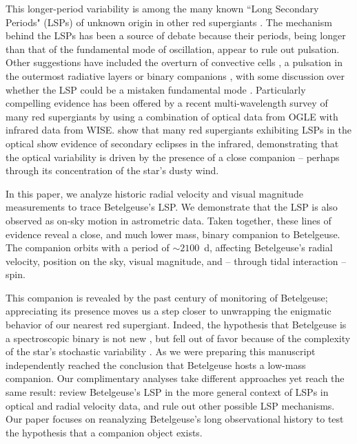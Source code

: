 \documentclass[twocolumn]{aastex631}
\begin{document}
This longer-period variability is among the many known ``Long Secondary Periods" (LSPs) of unknown origin in other red supergiants \citep[e.g.][]{1963AJ.....68..253H,1999IAUS..191..151W,2003ApJ...584.1035O,2004ApJ...604..800W,2006ApJ...650L..55D,2006MNRAS.372.1721K,2007ApJ...660.1486S,2009JRASC.103...11P,2009MNRAS.399.2063N,2009ApJ...707..573W,2010AJ....139.1909N,2010ApJ...725.1170S,2014ApJ...788...13S,2015MNRAS.448..464T,2015MNRAS.452.3863S,2016JAVSO..44...94P,2020MNRAS.492.1348T,2021ApJ...911L..22S,2021A&A...649A.110P,2023JAVSO..51..237P,2023StGal...6....6T,2024A&A...682A..88P}. The mechanism behind the LSPs has been a source of debate because their periods, being longer than that of the fundamental mode of oscillation, appear to rule out pulsation. Other suggestions have included the overturn of convective cells \citep[e.g.][]{2010ApJ...725.1170S}, a pulsation in the outermost radiative layers \citep{2015MNRAS.452.3863S,2020MNRAS.492.1348T}  or binary companions \citep{1999IAUS..191..151W,2004ApJ...604..800W,2007ApJ...660.1486S,2014ApJ...788...13S,2021ApJ...911L..22S}, with some discussion over whether the LSP could be a mistaken fundamental mode \citep{2023MNRAS.526.2765S,2023RNAAS...7..119M}. Particularly compelling evidence has been offered by a recent multi-wavelength survey of many red supergiants by \citet{2021ApJ...911L..22S} using a combination of optical data from OGLE with infrared data from WISE. \citet{2021ApJ...911L..22S} show that many red supergiants exhibiting LSPs in the optical show evidence of secondary eclipses in the infrared, demonstrating that the optical variability is driven by the presence of a close companion -- perhaps through its concentration of the star's dusty wind. 

In this paper, we analyze historic radial velocity and visual magnitude measurements to trace Betelgeuse's LSP. We demonstrate that the LSP is also observed as on-sky motion in astrometric data. 
Taken together, these lines of evidence reveal a close, and much lower mass, binary companion to Betelgeuse. The companion orbits with a period of $\sim 2100$~d, affecting Betelgeuse's radial velocity, position on the sky, visual magnitude, and -- through tidal interaction -- spin. 

This companion is revealed by the past century of monitoring of Betelgeuse; appreciating its presence moves us a step closer to unwrapping the enigmatic behavior of our nearest red supergiant. Indeed, the hypothesis that Betelgeuse is a spectroscopic binary is not new \citep{1908PASP...20..227P,1911LicOB...6..154C,1916ApJ....44..250L,1928MNRAS..88..660S,1933ApJ....77..110S}, but fell out of favor because of the complexity of the star's stochastic variability \citep[e.g.][]{1984PASP...96..366G}.  As we were preparing this manuscript \citet{2024arXiv240809089G} independently reached the conclusion that Betelgeuse hosts a low-mass companion. Our complimentary analyses take different approaches yet reach the same result: \citet{2024arXiv240809089G} review Betelgeuse's LSP in the more general context of LSPs in optical and radial velocity data, and rule out other possible LSP mechanisms. Our paper focuses on reanalyzing Betelgeuse's long observational history to test the hypothesis that a companion object exists.
\end{document}
